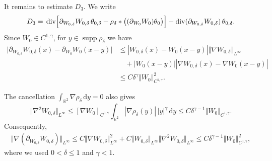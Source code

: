 \documentclass[reqno,11pt,a4paper]{amsart}
\newcommand{\dd}{\mathrm{d}}
\begin{document}
It remains to estimate $D_3$.
We write
\begin{align*}
  D_3
  ={}
  \operatorname{div}\Bigl[
    \partial_{W_{0,\delta}}W_{0,\delta}\,
      \theta_{0,\delta}
    -
    \rho_\delta*
    \bigl((\partial_{W_0}W_0)\theta_0\bigr)
  \Bigr]
  -
  \operatorname{div}
  (\partial_{W_{0,\delta}}W_{0,\delta})
  \,\theta_{0,\delta}.
\end{align*}
Since $W_0\in C^{1,\gamma}$, for
$y\in\operatorname{supp}\rho_\delta$ we have
\begin{align*}
  \bigl|
    \partial_{W_{0,\delta}}W_{0,\delta}(x)
    -\partial_{W_0}W_0(x-y)
  \bigr|
  &\leq
  |W_{0,\delta}(x)-W_0(x-y)|
  \Vert \nabla W_{0,\delta}\Vert _{L^\infty}
  \\
  &\quad+
  |W_0(x-y)|
  |\nabla W_{0,\delta}(x)-\nabla W_0(x-y)|
  \\
  &\leq
  C\delta^\gamma\Vert W_0\Vert _{C^{1,\gamma}}^2.
\end{align*}

The cancellation
$\int_{\mathbb R^2}\nabla\rho_\delta\,\dd y=0$
also gives
\[
  \Vert \nabla^2W_{0,\delta}\Vert _{L^\infty}
  \leq
  [\nabla W_0]_{C^{0,\gamma}}
  \int_{\mathbb R^2}
  |\nabla\rho_\delta(y)|\,|y|^\gamma\,\dd y
  \leq
  C\delta^{\gamma-1}\Vert W_0\Vert _{C^{1,\gamma}}.
\]
Consequently,
\begin{align*}
  \Vert \nabla(\partial_{W_{0,\delta}}W_{0,\delta})
    \Vert _{L^\infty}
  \leq
  C\Vert \nabla W_{0,\delta}\Vert _{L^\infty}^2
  +
  C\Vert W_{0,\delta}\Vert _{L^\infty}
  \Vert \nabla^2W_{0,\delta}\Vert _{L^\infty}
  \leq
  C\delta^{\gamma-1}\Vert W_0\Vert _{C^{1,\gamma}}^2,
\end{align*}
where we used $0<\delta\leq1$ and $\gamma<1$.
\end{document}
